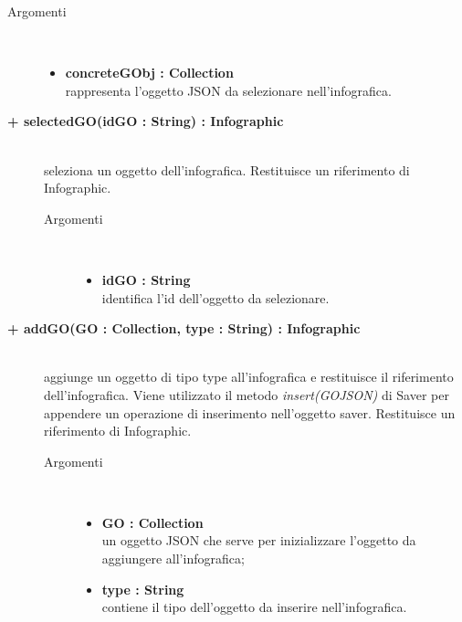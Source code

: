 \begin{description}
\begin{description}
		\begin{description}
			\item[Argomenti] \hfill \\
				\begin{itemize}
				
					\item \textbf{concreteGObj : Collection			} \hfill \\
					rappresenta l'oggetto JSON da selezionare nell'infografica.
				\end{itemize}
		\end{description}

\end{description}

\begin{description}
		\item[\textbf{\color{blue}+ selectedGO(idGO : String) : Infographic			}] \hfill \\
			seleziona un oggetto dell'infografica. Restituisce un riferimento di Infographic.

		\begin{description}
			\item[Argomenti] \hfill \\
				\begin{itemize}
				
					\item \textbf{idGO : String			} \hfill \\
					identifica l'id dell'oggetto da selezionare.
				\end{itemize}
		\end{description}

\end{description}

\begin{description}
		\item[\textbf{\color{blue}+ addGO(GO : Collection, type : String) : Infographic			}] \hfill \\
			aggiunge un oggetto di tipo type all'infografica e restituisce il riferimento dell'infografica. Viene utilizzato il metodo \textit{insert(GOJSON)} di Saver per appendere un operazione di inserimento nell'oggetto saver. Restituisce un riferimento di Infographic. 

\begin{description}
			\item[Argomenti] \hfill \\
				\begin{itemize}
						\item \textbf{GO : Collection			} \hfill \\
					un oggetto JSON che serve per inizializzare l'oggetto da aggiungere all'infografica;
					  	\item \textbf{type : String			} \hfill \\
					  	contiene il tipo dell'oggetto da inserire nell'infografica.
				\end{itemize}


\end{description}
\end{description}
\end{description}
